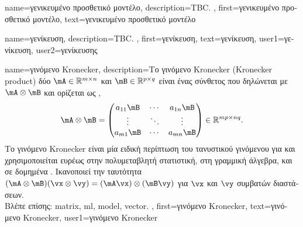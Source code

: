 {name={\foreignlanguage{greek}{γενικευμένο προσθετικό μοντέλο}},
	description={TBC. },
 	first={\foreignlanguage{greek}{γενικευμένο προσθετικό μοντέλο}},
 	text={\foreignlanguage{greek}{γενικευμένο προσθετικό μοντέλο}}
}

{name={\foreignlanguage{greek}{γενίκευση}}, 
	description={TBC. },
	first={\foreignlanguage{greek}{γενίκευση}},
	text={\foreignlanguage{greek}{γενίκευση}},
	user1={\foreignlanguage{greek}{γενίκευση}}, %
  	user2={\foreignlanguage{greek}{γενίκευσης}} %
}

{name={\foreignlanguage{greek}{γινόμενο} Kronecker}, 
	description={\foreignlanguage{greek}{Το γινόμενο} Kronecker 
		(Kronecker product) \foreignlanguage{greek}{δύο}  $\mA \in \mathbb{R}^{m \times n}$ 
		\foreignlanguage{greek}{και $\mB \in \mathbb{R}^{p \times q}$ είναι ένας σύνθετος}  
		\foreignlanguage{greek}{που δηλώνεται με $\mA \otimes \mB$ και ορίζεται ως} \cite{GolubVanLoanBook}, \cite{HornMatAnalysis}
    		\[
      		\mA \otimes \mB =
      		\begin{pmatrix}
        		a_{11}\mB & \cdots & a_{1n}\mB \\
        		\vdots & \ddots & \vdots \\
        		a_{m1}\mB & \cdots & a_{mn}\mB
      		\end{pmatrix}
      		\in \mathbb{R}^{mp \times nq}.
    		\]
    		\foreignlanguage{greek}{Το γινόμενο} Kronecker \foreignlanguage{greek}{είναι μία ειδική περίπτωση του τανυστικού 
		γινόμενου για}  \foreignlanguage{greek}{και χρησιμοποιείται ευρέως στην πολυμεταβλητή 
		στατιστική, στη γραμμική άλγεβρα, και σε δομημένα}  . 
		\foreignlanguage{greek}{Ικανοποιεί την ταυτότητα $(\mA \otimes \mB)(\vx \otimes \vy) = (\mA\vx) \otimes (\mB\vy)$ 
		για}  $\vx$ \foreignlanguage{greek}{και $\vy$ συμβατών διαστάσεων}. 
		\\
		\foreignlanguage{greek}{Βλέπε επίσης:} \gls{matrix}, \gls{ml}, \gls{model}, \gls{vector}. },
	first={\foreignlanguage{greek}{γινόμενο} Kronecker},
	text={\foreignlanguage{greek}{γινόμενο} Kronecker},
	user1={\foreignlanguage{greek}{γινόμενο} Kronecker} %
}

